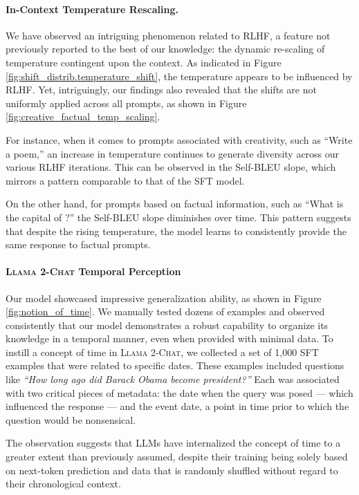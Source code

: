 \paragraph{In-Context Temperature Rescaling.} 

We have observed an intriguing phenomenon related to RLHF, a feature not previously reported to the best of our knowledge: the dynamic re-scaling of temperature contingent upon the context. As indicated in Figure \ref{fig:shift_distrib.temperature_shift}, the temperature appears to be influenced by RLHF. Yet, intriguingly, our findings also revealed that the shifts are not uniformly applied across all prompts, as shown in Figure \ref{fig:creative_factual_temp_scaling}.

For instance, when it comes to prompts associated with creativity, such as ``Write a poem,'' an increase in temperature continues to generate diversity across our various RLHF iterations. This can be observed in the Self-BLEU slope, which mirrors a pattern comparable to that of the SFT model.

On the other hand, for prompts based on factual information, such as ``What is the capital of ?'' the Self-BLEU slope diminishes over time. This pattern suggests that despite the rising temperature, the model learns to consistently provide the same response to factual prompts.

\paragraph{\textsc{Llama 2-Chat} Temporal Perception}
\label{sec:temporal_knowledge_organization}

Our model showcased impressive generalization ability, as shown in Figure \ref{fig:notion_of_time}. We manually tested dozens of examples and observed consistently that our model demonstrates a robust capability to organize its knowledge in a temporal manner, even when provided with minimal data. To instill a concept of time in \textsc{Llama 2-Chat}, we collected a set of 1,000 SFT examples that were related to specific dates. These examples included questions like \textit{``How long ago did Barack Obama become president?''} Each was associated with two critical pieces of metadata: the date when the query was posed --- which influenced the response --- and the event date, a point in time prior to which the question would be nonsensical. 

The observation suggests that LLMs have internalized the concept of time to a greater extent than previously assumed, despite their training being solely based on next-token prediction and data that is randomly shuffled without regard to their chronological context.

